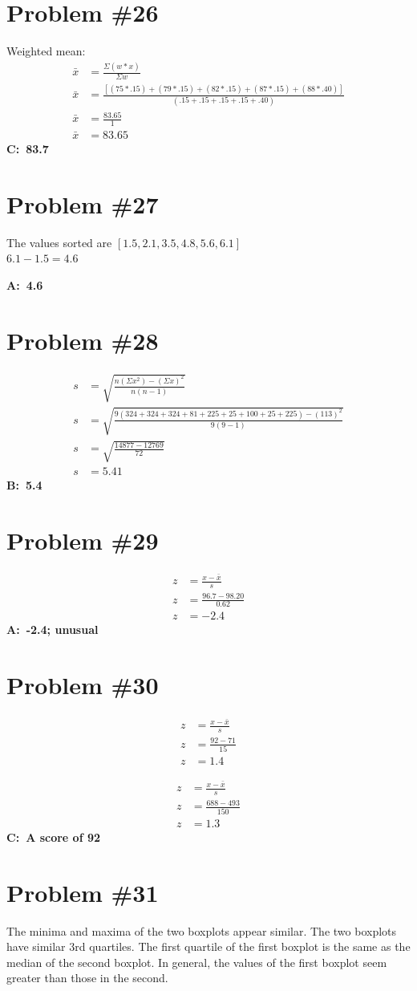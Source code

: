 \documentclass[12pt,fleqn]{article}
\newcommand{\problem}[1]{\vspace{5ex}\section*{Problem \##1}}
\begin{document}
\problem{26}
Weighted mean:
\begin{align*}
  \bar{x} &= \frac{\Sigma(w * x)}{\Sigma w} \\
  \bar{x} &= \frac{[(75 * .15) + (79 * .15) + (82 * .15) + (87 * .15) + (88 * .40)]}{(.15 + .15 + .15 + .15 + .40)} \\
  \bar{x} &= \frac{83.65}{1} \\
  \bar{x} &= 83.65
\end{align*}
\textbf{C:\ 83.7}


\problem{27}
The values sorted are $[1.5, 2.1, 3.5, 4.8, 5.6, 6.1]$ \\
$6.1 - 1.5 = 4.6$

\textbf{A:\ 4.6}


\problem{28}
\begin{align*}
  s &= \sqrt{\frac{n(\Sigma x^2) - (\Sigma x)^2}{n(n-1)}} \\
  s &= \sqrt{\frac{9(324 + 324 + 324 + 81 + 225 + 25 + 100 + 25 + 225) - (113)^2}{9(9-1)}} \\
  s &= \sqrt{\frac{14877 - 12769}{72}} \\
  s &= 5.41
\end{align*}
\textbf{B:\ 5.4}


\problem{29}
\begin{align*}
  z &= \frac{x - \bar{x}}{s} \\
  z &= \frac{96.7 - 98.20}{0.62} \\
  z &= -2.4
\end{align*}
\textbf{A:\ -2.4; unusual}


\problem{30}
\begin{align*}
  z &= \frac{x - \bar{x}}{s} \\
  z &= \frac{92 - 71}{15} \\
  z &= 1.4
\end{align*}

\begin{align*}
  z &= \frac{x - \bar{x}}{s} \\
  z &= \frac{688 - 493}{150} \\
  z &= 1.3
\end{align*}
\textbf{C:\ A score of 92}

\problem{31}
The minima and maxima of the two boxplots appear similar. The two boxplots have similar 3rd quartiles. The first quartile of the first boxplot is the same as the median of the second boxplot. In general, the values of the first boxplot seem greater than those in the second.
\end{document}

